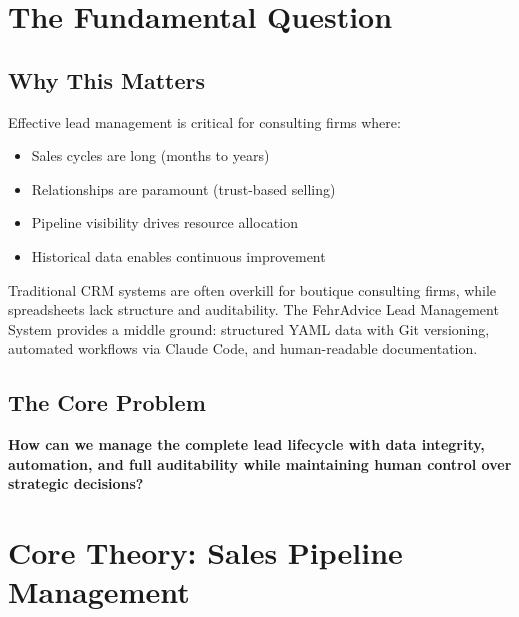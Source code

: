 
\section{The Fundamental Question}
\label{sec:bn-fundamental}

\subsection{Why This Matters}

Effective lead management is critical for consulting firms where:
\begin{itemize}
    \item Sales cycles are long (months to years)
    \item Relationships are paramount (trust-based selling)
    \item Pipeline visibility drives resource allocation
    \item Historical data enables continuous improvement
\end{itemize}

Traditional CRM systems are often overkill for boutique consulting firms, while spreadsheets lack structure and auditability. The FehrAdvice Lead Management System provides a middle ground: structured YAML data with Git versioning, automated workflows via Claude Code, and human-readable documentation.

\subsection{The Core Problem}

\begin{tcolorbox}[colback=red!5!white, colframe=red!75!black,
    title=The Fundamental Question]
\textbf{How can we manage the complete lead lifecycle with data integrity, automation, and full auditability while maintaining human control over strategic decisions?}
\end{tcolorbox}


\section{Core Theory: Sales Pipeline Management}
\label{sec:bn-theory}

